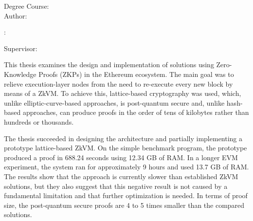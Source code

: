 \begin{minipage}[t]{1\columnwidth}
	\FIITuniversity

	\FIITfaculty

	Degree Course: \FIITstudyProgram\\

	Author: \FIITauthor

	\FIITthesis: \FIITtitle

	Supervisor: \FIITsupervisor

	\FIITdate
\end{minipage}

\bigskip{}

This thesis examines the design and implementation of solutions using
Zero-Knowledge Proofs (ZKPs) in the Ethereum ecosystem. The main goal was to
relieve execution-layer nodes from the need to re-execute every new block by
means of a ZkVM. To achieve this, lattice-based cryptography was used, which,
unlike elliptic-curve-based approaches, is post-quantum secure and, unlike
hash-based approaches, can produce proofs in the order of tens of kilobytes
rather than hundreds or thousands.

The thesis succeeded in designing the architecture and partially implementing a
prototype lattice-based ZkVM. On the simple benchmark program, the prototype
produced a proof in 688.24 seconds using 12.34 GB of RAM. In a longer EVM
experiment, the system ran for approximately 9 hours and used 13.7 GB of RAM.
The results show that the approach is currently slower than established ZkVM
solutions, but they also suggest that this negative result is not caused by a
fundamental limitation and that further optimization is needed. In terms of
proof size, the post-quantum secure proofs are 4 to 5 times smaller than the
compared solutions.

\newpage{}\thispagestyle{empty}

\emptypage
